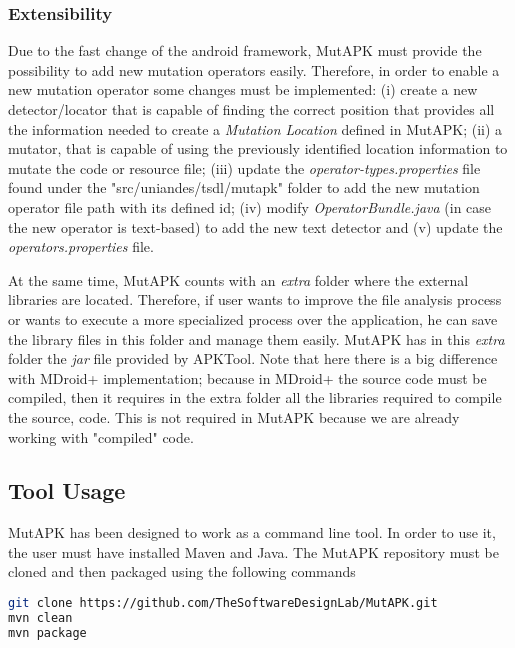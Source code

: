 \subsubsection{Extensibility}

Due to the fast change of the android framework, MutAPK must provide the possibility to add new mutation operators easily. Therefore, in order to enable a new mutation operator some changes must be implemented: (i) create a new detector/locator that is capable of finding the correct position that provides all the information needed to create a \textit{Mutation Location} defined in MutAPK; (ii) a mutator, that is capable of using the previously identified location information to mutate the code or resource file; (iii) update the \textit{operator-types.properties} file found under the "src/uniandes/tsdl/mutapk" folder to add the new mutation operator file path with its defined id; (iv) modify \textit{OperatorBundle.java} (in case the new operator is text-based) to add the new text detector and (v) update the \textit{operators.properties} file.

At the same time, MutAPK counts with an \textit{extra} folder where the external libraries are located. Therefore, if user wants to improve the file analysis process or wants to execute a more specialized process over the application, he can save the library files in this folder and manage them easily. MutAPK has in this \textit{extra} folder the \textit{jar} file provided by APKTool. Note that here there is a big difference with MDroid+ implementation; because in MDroid+ the source code must be compiled, then it requires in the extra folder all the libraries required to compile the source, code. This is not required in MutAPK because we are already working with "compiled" code.
\subsection{Tool Usage}
MutAPK has been designed to work as a command line tool. In order to use it, the user must have installed Maven and Java. The MutAPK repository\cite{MutAPK} must be cloned and then packaged using the following commands

\begin{minipage}{\linewidth}
	\begin{lstlisting}[language={sh}, label={lst:mvn}, caption={Git and Maven commands to build MutAPK}, numbers=none]
git clone https://github.com/TheSoftwareDesignLab/MutAPK.git
mvn clean
mvn package
	\end{lstlisting}
\end{minipage}\\

